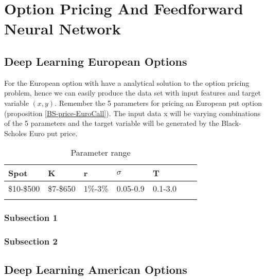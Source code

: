 
\chapter{Option Pricing And Feedforward Neural Network} %

\label{Chapter5} %


\section{Deep Learning European Options}
For the European option with have a analytical solution to the option pricing problem, hence we can easily produce the data set with input features and target variable $(x,y)$. Remember the 5 parameters for pricing an European put option (proposition \ref{BS-price-EuroCall}). The input data x will be varying combinations of the 5 parameters and the target variable will be generated by the Black-Scholes Euro put price. 

\begin{table}[th]
\caption{Parameter range}
\label{tab:treatments}
\centering
\begin{tabular}{l l l l l l l }
\toprule
\textbf{Spot} &  \textbf{K} & \textbf{r} & \textbf{$\sigma$} & \textbf{T} \\
\midrule
\$10-\$500 & \$7-\$650 & 1\%-3\% & 0.05-0.9 & 0.1-3.0\\ 
\bottomrule\\
\end{tabular}
\end{table}

\subsection{Subsection 1}



\subsection{Subsection 2}



\section{Deep Learning American Options}

